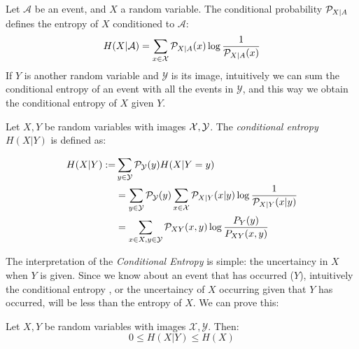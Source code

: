 Let $\mathcal A$ be an event, and $X$ a random variable. The conditional probability $\mathcal{P}_{X|A}$ defines the entropy of $X$ conditioned to $\mathcal A$:
$$
H(X|\mathcal A) = \sum_{x \in \mathcal{X}} \mathcal{P}_{X|A}(x) \log\frac{1}{\mathcal{P}_{X|A}(x)}
$$
If $Y$ is another random variable and $\mathcal Y$ is its image, intuitively we can sum the conditional entropy of an event with all the events in $\mathcal Y$, and this way we obtain the conditional entropy of $X$ given $Y$.
\begin{ndef}
Let $X,Y$ be random variables with images $\mathcal{X},\mathcal Y$. The \emph{conditional entropy} $H(X | Y)$ is defined as:

\begin{equation*}
        \begin{split}
    H(X|Y) :=  & \sum_{y \in \mathcal Y} \mathcal{P}_{\mathcal Y}(y) H(X| Y = y)  \\ 
    & = \sum_{y \in \mathcal Y} \mathcal{P}_{\mathcal  Y}(y) \sum_{x \in \mathcal{X}} \mathcal{P}_{X | Y}(x|y)\log\frac{1}{\mathcal{P}_{X|Y}(x|y)}  \\
   & = \sum_{x \in X,y \in \mathcal Y}\mathcal{P}_{XY}(x,y)\log\frac{P_Y(y)}{P_{XY}(x,y)}
\end{split}
\end{equation*}



\end{ndef}
The interpretation of the \emph{Conditional Entropy} is simple: the uncertaincy in $X$ when $Y$ is given. Since we know about an event that has occurred ($Y$), intuitively the conditional entropy , or the uncertaincy of $X$ occurring given that $Y$ has occurred, will be less than the entropy of $X$. We can prove this:

\begin{nprop}
Let $X,Y$ be random variables with images $\mathcal X, \mathcal Y$. Then:
$$
0 \leq H(X|Y) \leq H(X)
$$
\end{nprop}


